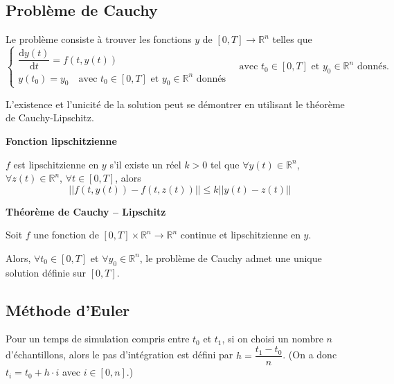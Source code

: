 \documentclass[10pt,fleqn]{article} %
\begin{document}

\vspace{2cm}
\pagestyle{fancy}
\thispagestyle{plain}


\subsection*{Problème de Cauchy}
\begin{rappel} 
Le problème consiste à trouver les fonctions $y$ de $[0,T]\rightarrow \mathbb{R}^n$ telles que
$$
\left\{
\begin{array}{l}
\dfrac{\text{d} y(t)}{\text{d} t}=f(t,y(t)) \\
y(t_0)=y_0 \quad \text{avec } t_0\in [0,T] \text{ et } y_0\in \mathbb{R}^n \text{ donnés}
\end{array}
\quad \text{avec } t_0\in [0,T] \text{ et } y_0\in \mathbb{R}^n \text{ donnés.}
\right.
 $$ 
\end{rappel}
L'existence et l'unicité de la solution peut se démontrer en utilisant le théorème de Cauchy-Lipschitz.


\begin{defi}
\textbf{Fonction lipschitzienne}

$f$ est lipschitzienne en $y$ s'il existe un réel $k>0$ tel que $\forall y(t)\in\mathbb{R}^n$, $\forall z(t)\in\mathbb{R}^n$, $\forall t\in[0,T]$, alors 
$$
||f(t,y(t))-f(t,z(t))||\leq k||y(t)-z(t)||
$$

\end{defi}

\begin{theorem}
\textbf{Théorème de Cauchy -- Lipschitz}

Soit $f$ une fonction de $[0,T] \times \mathbb{R}^n \rightarrow \mathbb{R}^n$ continue et lipschitzienne en $y$. 

Alors, $\forall t_0 \in [0,T]$ et $\forall y_0 \in \mathbb{R}^n$, le problème de Cauchy admet une unique solution définie sur $[0,T]$.

\end{theorem}

\subsection*{Méthode d'Euler}
Pour un temps de simulation compris entre $t_0$ et $t_1$, si on choisi un nombre $n$ d'échantillons, alors le pas d'intégration est défini par  $h=\dfrac{t_1-t_0}{n}$. (On a donc $t_i = t_0+h\cdot i$ avec $i\in[0,n]$.)
\end{document}

